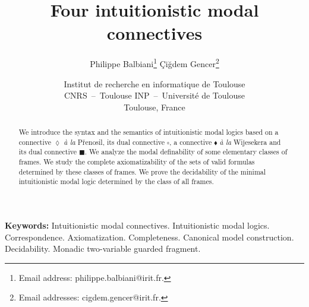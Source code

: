 \documentclass[draft]{article}
\begin{document}
%
%
%
%
\title{Four intuitionistic modal connectives}
%
%
%
%
\author{Philippe Balbiani\footnote{Email address: philippe.balbiani@irit.fr.}
%
%
\hspace{0.31cm}
%
%
\c{C}i\u{g}dem Gencer\footnote{Email addresses: cigdem.gencer@irit.fr.}}
%
%
%
%
\date{Institut de recherche en informatique de Toulouse
%
%
\\
%
%
CNRS~--~Toulouse INP~--~Universit\'e de Toulouse
%
%
\\
%
%
Toulouse, France}
%
%
%
%
\maketitle
%
%
%
%
\begin{abstract}
%
%
We introduce the syntax and the semantics of intuitionistic modal logics based on a connective $\lozenge$ {\em \`a la}\/ P\v{r}enosil, its dual connective $\square$, a connective $\blacklozenge$ {\em \`a la}\/ Wijesekera and its dual connective $\blacksquare$.
We analyze the modal definability of some elementary classes of frames.
We study the complete axiomatizability of the sets of valid formulas determined by these classes of frames.
We prove the decidability of the minimal intuitionistic modal logic determined by the class of all frames.
%
%
\end{abstract}
%
%
%
%
{\bf Keywords:}
%
%
Intuitionistic modal connectives.
Intuitionistic modal logics.
Correspondence.
Axiomatization.
Completeness.
Canonical model construction.
Decidability.
Monadic two-variable guarded fragment.
%
%
%
%
\end{document}

